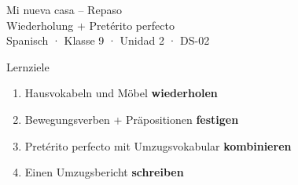 \documentclass[aspectratio=169, 11pt]{beamer}
\begin{document}

{
\begin{frame}[plain]
    \vfill
    \begin{center}
        {Mi nueva casa – Repaso}\\[8pt]
        {Wiederholung + Pretérito perfecto}\\[20pt]
        {\small Spanisch · Klasse 9 · Unidad 2 · DS-02}
    \end{center}
    \vfill
\end{frame}
}


\begin{frame}{Lernziele}
    \begin{enumerate}
        \item Hausvokabeln und Möbel \textbf{wiederholen}
        \item Bewegungsverben + Präpositionen \textbf{festigen}
        \item Pretérito perfecto mit Umzugsvokabular \textbf{kombinieren}
        \item Einen Umzugsbericht \textbf{schreiben}
    \end{enumerate}

    \vspace{15pt}

    \begin{center}
    \end{center}
\end{frame}

\end{document}
